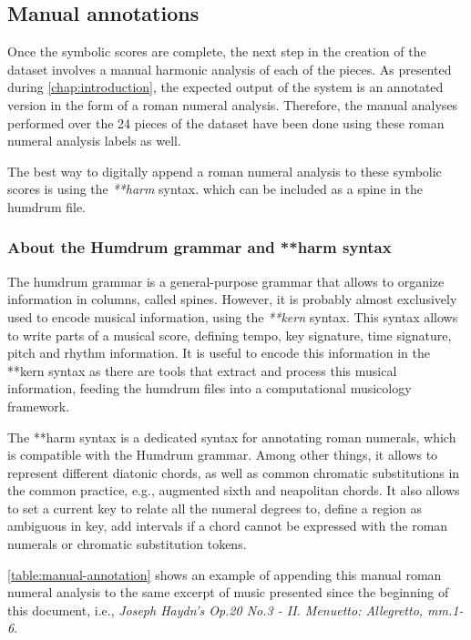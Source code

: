 \subsection{Manual annotations}
Once the symbolic scores are complete, the next step in the creation of the dataset involves a manual harmonic analysis of each of the pieces. As presented during \autoref{chap:introduction}, the expected output of the system is an annotated version in the form of a roman numeral analysis. Therefore, the manual analyses performed over the 24 pieces of the dataset have been done using these roman numeral analysis labels as well.

The best way to digitally append a roman numeral analysis to these symbolic scores is using the \emph{**harm} \cite{harm} syntax. which can be included as a spine in the humdrum file.

\subsubsection{About the Humdrum grammar and **harm syntax}
The humdrum grammar is a general-purpose grammar that allows to organize information in columns, called spines. However, it is probably almost exclusively used to encode musical information, using the \emph{**kern} syntax. This syntax allows to write parts of a musical score, defining tempo, key signature, time signature, pitch and rhythm information. It is useful to encode this information in the **kern syntax as there are tools that extract and process this musical information, feeding the humdrum files into a computational musicology framework.

The **harm syntax is a dedicated syntax for annotating roman numerals, which is compatible with the Humdrum grammar. Among other things, it allows to represent different diatonic chords, as well as common chromatic substitutions in the common practice, e.g., augmented sixth and neapolitan chords. It also allows to set a current key to relate all the numeral degrees to, define a region as ambiguous in key, add intervals if a chord cannot be expressed with the roman numerals or chromatic substitution tokens.

\autoref{table:manual-annotation} shows an example of appending this manual roman numeral analysis to the same excerpt of music presented since the beginning of this document, i.e., \emph{Joseph Haydn's Op.20 No.3 - II. Menuetto: Allegretto, mm.1-6}.

